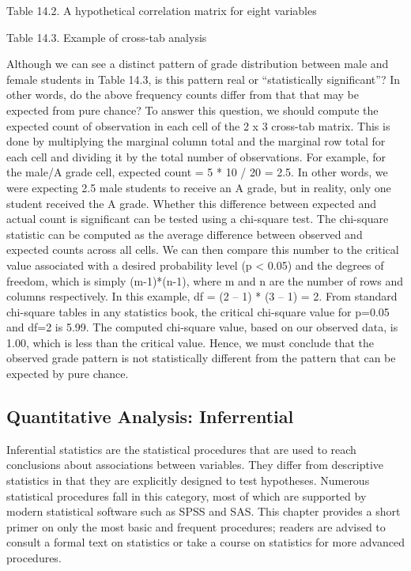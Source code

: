 Table 14.2. A hypothetical correlation matrix for eight variables

Table 14.3. Example of cross-tab analysis

Although we can see a distinct pattern of grade distribution between male and female students in Table 14.3, is this pattern real or “statistically significant”? In other words, do the above frequency counts differ from that that may be expected from pure chance? To answer this question, we should compute the expected count of observation in each cell of the 2 x 3 cross-tab matrix. This is done by multiplying the marginal column total and the marginal row total for each cell and dividing it by the total number of observations. For example, for the male/A grade cell, expected count = 5 * 10 / 20 = 2.5. In other words, we were expecting 2.5 male students to receive an A grade, but in reality, only one student received the A grade. Whether this difference between expected and actual count is significant can be tested using a chi-square test. The chi-square statistic can be computed as the average difference between observed and expected counts across all cells. We can then compare this number to the critical value associated with a desired probability level (p < 0.05) and the degrees of freedom, which is simply (m-1)*(n-1), where m and n are the number of rows and columns respectively. In this example, df = (2 – 1) * (3 – 1) = 2. From standard chi-square tables in any statistics book, the critical chi-square value for p=0.05 and df=2 is 5.99. The computed chi-square value, based on our observed data, is 1.00, which is less than the critical value. Hence, we must conclude that the observed grade pattern is not statistically different from the pattern that can be expected by pure chance.

\subsection{Quantitative Analysis: Inferrential}

Inferential statistics are the statistical procedures that are used to reach conclusions about associations between variables. They differ from descriptive statistics in that they are explicitly designed to test hypotheses. Numerous statistical procedures fall in this category, most of which are supported by modern statistical software such as SPSS and SAS. This chapter provides a short primer on only the most basic and frequent procedures; readers are advised to consult a formal text on statistics or take a course on statistics for more advanced procedures.





